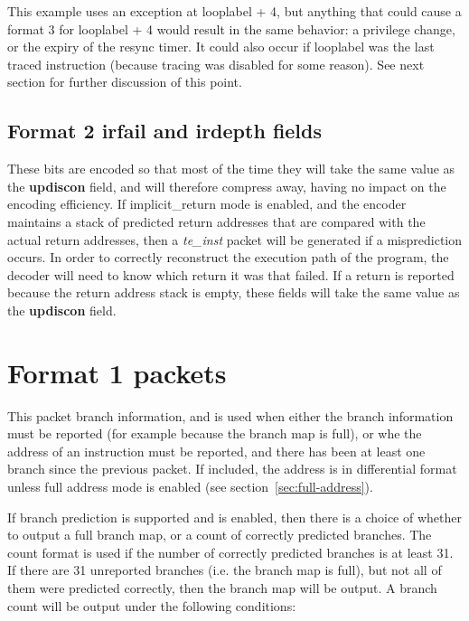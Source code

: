 This example uses an exception at looplabel + 4, but anything that could cause a format 3 for looplabel + 4 would result in 
the same behavior: a privilege change, or the expiry of the resync timer.  It could also occur if looplabel was the last
traced instruction (because tracing was disabled for some reason).  See next section for further discussion of this point.

\subsection{Format 2 \textbf{irfail} and \textbf{irdepth} fields} \label{sec:irxx}
These bits are encoded so that most of the time they will take the same value as the \textbf{updiscon} field,
and will therefore compress away, having no impact on the encoding efficiency.  If implicit\_return mode is enabled, and
the encoder maintains a stack of predicted return addresses that are compared with the actual return addresses, then
a \textit{te\_inst} packet will be generated if a misprediction occurs.  In order to correctly reconstruct the 
execution path of the program, the decoder will need to know which return it was that failed.  If a return is reported
because the return address stack is empty, these fields will take the same value as the \textbf{updiscon} field.

\FloatBarrier
\section{Format 1 packets} \label{sec:format1}

This packet branch information, and is used when either the branch information must be reported 
(for example because the branch map is full), or whe the address of an instruction must be reported, and there has 
been at least one branch since the previous packet.  If included, the address is in differential format unless full 
address mode is enabled (see section~\ref{sec:full-address}).

If branch prediction is supported and is enabled, then there is a choice of whether to output a 
full branch map, or a count of correctly predicted branches.  The count format is used if the number 
of correctly predicted branches is at least 31.  If there are 31 unreported branches (i.e. the branch
map is full), but not all of them were predicted correctly, then the branch map will be output.  A branch 
count will be output under the following conditions:

